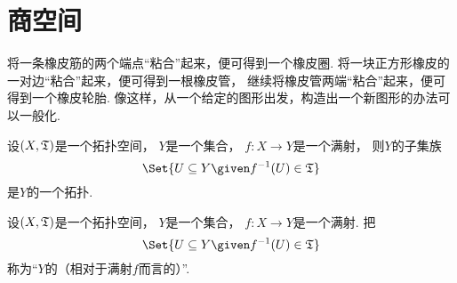 \section{商空间}
将一条橡皮筋的两个端点“粘合”起来，便可得到一个橡皮圈.
将一块正方形橡皮的一对边“粘合”起来，便可得到一根橡皮管，
继续将橡皮管两端“粘合”起来，便可得到一个橡皮轮胎.
像这样，从一个给定的图形出发，构造出一个新图形的办法可以一般化.

\begin{proposition}
设\((X,{\mathfrak T})\)是一个拓扑空间，
\(Y\)是一个集合，
\(f\colon X \to Y\)是一个满射，
则\(Y\)的子集族\begin{equation*}
	\Set{
		U \subseteq Y
		\given
		f^{-1}(U) \in \T
	}
\end{equation*}
是\(Y\)的一个拓扑.
\end{proposition}

\begin{definition}
设\((X,{\mathfrak T})\)是一个拓扑空间，
\(Y\)是一个集合，
\(f\colon X \to Y\)是一个满射.
把\begin{equation*}
	\Set{
		U \subseteq Y
		\given
		f^{-1}(U) \in \T
	}
\end{equation*}
称为“\(Y\)的（相对于满射\(f\)而言的）”.
\end{definition}
